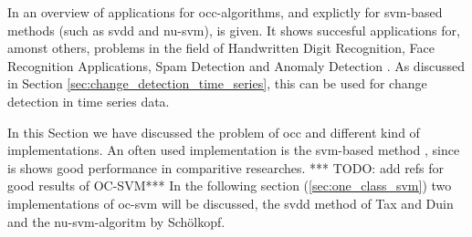 In \cite{khan2010survey,noumir2012simple} an overview of applications for \gls{occ}-algorithms, and explictly for \gls{svm}-based methods (such as \gls{svdd} and \gls{nu-svm}), is given.
It shows succesful applications for, amonst others, problems in the field of Handwritten Digit Recognition, Face Recognition Applications, Spam Detection and Anomaly Detection \cite{li2003improving,perdisci2006using}.
As discussed in Section \ref{sec:change_detection_time_series}, this can be used for change detection in time series data.

In this Section we have discussed the problem of \gls{occ} and different kind of implementations.
An often used implementation is the \gls{svm}-based method \cite{noumir2012simple}, since is shows good performance in comparitive researches.
*** TODO: add refs for good results of OC-SVM***
In the following section (\ref{sec:one_class_svm}) two implementations of \gls{oc-svm} will be discussed, the \gls{svdd} method of Tax and Duin \cite{tax2004support} and the \gls{nu-svm}-algoritm by Sch\"olkopf.






